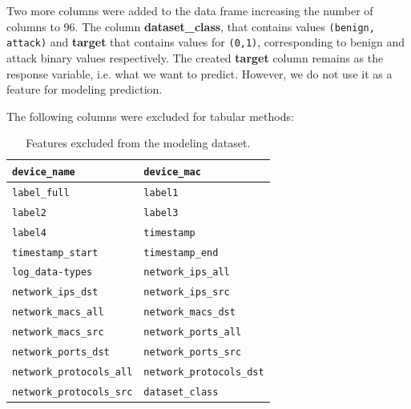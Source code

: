 \documentclass[final,5p,times,twocolumn]{elsarticle}
\begin{document}
\begin{table}[H]
\caption{Dataset sizes before and after combining benign and attack data.}
\centering
\small
\setlength{\tabcolsep}{3pt}
\renewcommand{\arraystretch}{1.15}
\label{tab:dataset_sizes}
\end{table}

Two more columns were added to the data frame increasing the number of columns to 96. The column \textbf{dataset\_class}, that contains values \texttt{(benign, attack)} and \textbf{target} that contains values for \texttt{(0,1)}, corresponding to benign and attack binary values respectively. The created \textbf{target} column remains as the response variable, i.e. what we want to predict. However, we do not use it as a feature for modeling prediction.


The following columns were excluded for tabular methods:
\begin{table}[H]
\caption{Features excluded from the modeling dataset.}
\centering
\scriptsize
\renewcommand{\arraystretch}{1.20}
\begin{tabularx}{\columnwidth}{|X|X|}
\hline
\texttt{device\_name} & \texttt{device\_mac} \\ \hline
\texttt{label\_full} & \texttt{label1} \\ \hline
\texttt{label2} & \texttt{label3} \\ \hline
\texttt{label4} & \texttt{timestamp} \\ \hline
\texttt{timestamp\_start} & \texttt{timestamp\_end} \\ \hline
\texttt{log\_data-types} & \texttt{network\_ips\_all} \\ \hline
\texttt{network\_ips\_dst} & \texttt{network\_ips\_src} \\ \hline
\texttt{network\_macs\_all} & \texttt{network\_macs\_dst} \\ \hline
\texttt{network\_macs\_src} & \texttt{network\_ports\_all} \\ \hline
\texttt{network\_ports\_dst} & \texttt{network\_ports\_src} \\ \hline
\texttt{network\_protocols\_all} & \texttt{network\_protocols\_dst} \\ \hline
\texttt{network\_protocols\_src} & \texttt{dataset\_class} \\ \hline
\end{tabularx}
\label{tab:excluded_features}
\end{table}
\end{document}
